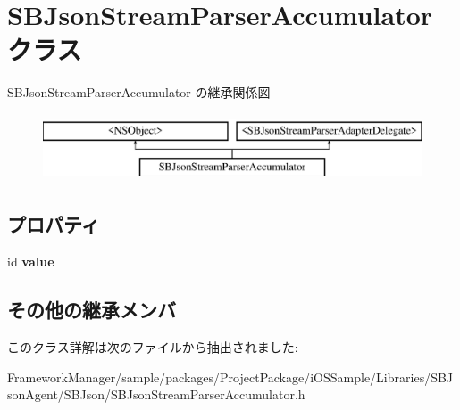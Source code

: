 \hypertarget{interface_s_b_json_stream_parser_accumulator}{}\section{S\+B\+Json\+Stream\+Parser\+Accumulator クラス}
\label{interface_s_b_json_stream_parser_accumulator}
S\+B\+Json\+Stream\+Parser\+Accumulator の継承関係図\begin{figure}[H]
\begin{center}
\leavevmode
\includegraphics[height=2.000000cm]{interface_s_b_json_stream_parser_accumulator}
\end{center}
\end{figure}
\subsection*{プロパティ}
\begin{DoxyCompactItemize}
\item 
\hypertarget{interface_s_b_json_stream_parser_accumulator_a4ec442f555b8bb24cb2f20be59dd6ca6}{}id {\bfseries value}\label{interface_s_b_json_stream_parser_accumulator_a4ec442f555b8bb24cb2f20be59dd6ca6}

\end{DoxyCompactItemize}
\subsection*{その他の継承メンバ}


このクラス詳解は次のファイルから抽出されました\+:\begin{DoxyCompactItemize}
\item 
Framework\+Manager/sample/packages/\+Project\+Package/i\+O\+S\+Sample/\+Libraries/\+S\+B\+Json\+Agent/\+S\+B\+Json/S\+B\+Json\+Stream\+Parser\+Accumulator.\+h\end{DoxyCompactItemize}
